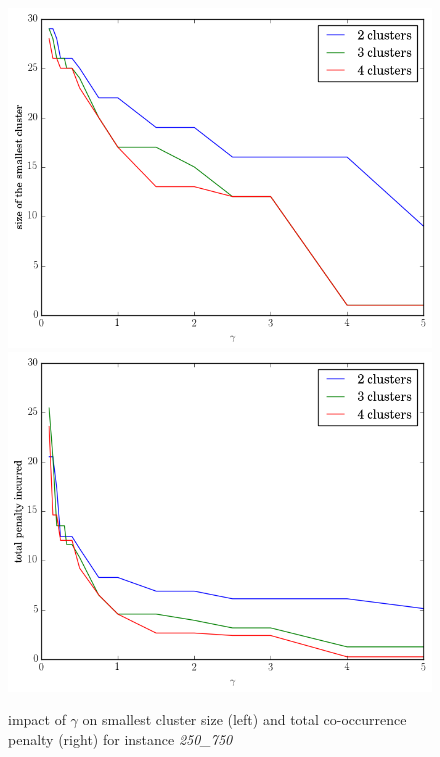 \documentclass[conference]{IEEEtran}
\begin{document}
\begin{figure}
\centering
\includegraphics[scale=0.25]{images/gamma_smallest_cluster_size}
\includegraphics[scale=0.25]{images/gamma_total_penalty_incurred}
\captionsetup{font=small}
\caption{impact of $\gamma$ on smallest cluster size (left) and total co-occurrence penalty (right) for instance \emph{250\_750}}
\label{fig:gamma}
\end{figure}
\end{document}
